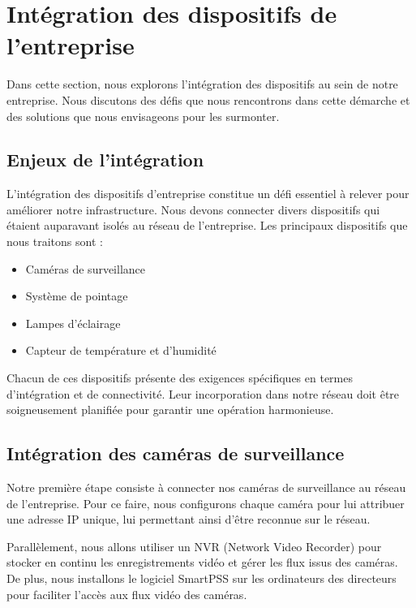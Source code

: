 \section{Intégration des dispositifs de l'entreprise}

Dans cette section, nous explorons l'intégration des dispositifs au sein de notre entreprise. Nous discutons des défis que nous rencontrons dans cette démarche et des solutions que nous envisageons pour les surmonter.

\subsection{Enjeux de l'intégration}

L'intégration des dispositifs d'entreprise constitue un défi essentiel à relever pour améliorer notre infrastructure. Nous devons connecter divers dispositifs qui étaient auparavant isolés au réseau de l'entreprise. Les principaux dispositifs que nous traitons sont :


\begin{itemize}
\item Caméras de surveillance

\item Système de pointage

\item Lampes d'éclairage

\item Capteur de température et d'humidité
\end{itemize}

Chacun de ces dispositifs présente des exigences spécifiques en termes d'intégration et de connectivité. Leur incorporation dans notre réseau doit être soigneusement planifiée pour garantir une opération harmonieuse.

\subsection{Intégration des caméras de surveillance}

Notre première étape consiste à connecter nos caméras de surveillance au réseau de l'entreprise. Pour ce faire, nous configurons chaque caméra pour lui attribuer une adresse IP unique, lui permettant ainsi d'être reconnue sur le réseau. 

Parallèlement, nous allons utiliser un NVR (Network Video Recorder) pour stocker en continu les enregistrements vidéo et gérer les flux issus des caméras. De plus, nous installons le logiciel SmartPSS sur les ordinateurs des directeurs pour faciliter l'accès aux flux vidéo des caméras.

